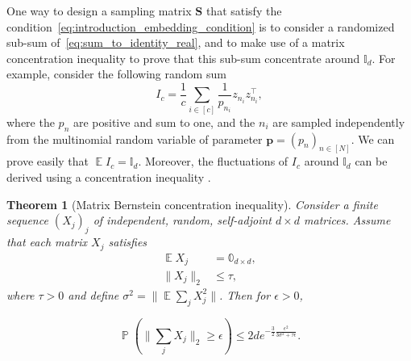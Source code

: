 \documentclass[twoside,11pt]{book}
\newtheorem{theorem}{Theorem}
\numberwithin{theorem}{chapter}
\numberwithin{definition}{chapter}
\numberwithin{proposition}{chapter}
\numberwithin{corollary}{chapter}
\numberwithin{example}{chapter}
\numberwithin{lemma}{chapter}
\numberwithin{assumption}{chapter}
\numberwithin{equation}{chapter}
\numberwithin{figure}{chapter}
\DeclareMathOperator{\Tran}{\intercal}
\DeclareMathOperator{\EX}{\mathbb{E}}
\DeclareMathOperator{\Prb}{\mathbb{P}}
\begin{document}
One way to design a sampling matrix $\bm{S}$ that satisfy the condition~\eqref{eq:introduction_embedding_condition} is to consider a randomized sub-sum of~\eqref{eq:sum_to_identity_real}, and to make use of a matrix concentration inequality to prove that this sub-sum concentrate around $\mathbb{I}_{d}$. For example, consider the following random sum
\begin{equation}
I_{c} = \frac{1}{c}\sum\limits_{i \in [c]} \frac{1}{p_{n_{i}}}z_{{n_{i}}}z_{{n_{i}}}^{\Tran},
\end{equation}
where the $p_n$ are positive and sum to one, and the $n_{i}$ are sampled independently from the multinomial random variable of parameter $\bm{p} = (p_{n})_{n \in [N]}$. We can prove easily that $\EX I_{c} = \mathbb{I}_{d}$. Moreover, the fluctuations of $I_{c}$ around $\mathbb{I}_{d}$ can be derived using a concentration inequality \citep{Tro15}.
\begin{theorem}[Matrix Bernstein concentration inequality]\label{thm:matrix_bernstein}
Consider a finite sequence $(X_{j})_{j}$ of independent, random, self-adjoint $d\times d$ matrices. Assume that each matrix $X_{j}$
satisfies 
\begin{align}
 \EX X_{j} &= \mathbb{0}_{d \times d},\\
 \|X_{j}\|_{2} &\leq \tau,
\end{align}
where $\tau >0$ and define $\sigma^{2} = \|\EX \sum\limits_{j} X_{j}^{2}\|$.
 Then for $\epsilon >0$, 

\begin{equation}
\Prb \left( \|\sum\limits_{j} X_{j}\|_{2} \geq \epsilon \right) \leq 2 d e^{-\frac{3}{2} \frac{\epsilon^{2}}{3\sigma^{2} + \tau \epsilon}}.
\end{equation}
\end{theorem}
\end{document}
